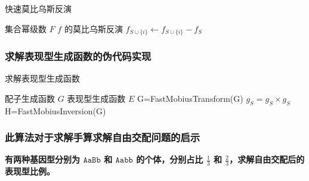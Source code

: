 \documentclass{article}
\begin{document}
\begin{algorithm}
    \caption{快速莫比乌斯反演}
    \begin{algorithmic}[1]
        \Require 集合幂级数 $F$
        \Ensure $f$ 的莫比乌斯反演
                    \State $f_{S \cup \{i\}} \gets f_{S \cup \{i\}} - f_{S}$
                \EndFor
            \EndFor
            \State {}
        \EndFunction
    \end{algorithmic}
\end{algorithm}

\newpage

\subsubsection*{求解表现型生成函数的伪代码实现}

\begin{algorithm}
    \caption{求解表现型生成函数}
    \begin{algorithmic}[1]
        \Require 配子生成函数 $G$
        \Ensure 表现型生成函数 $E$
			\State G=FastMobiusTransform(G)
                \State $g_S=g_S \times g_S$
            \EndFor
			\State H=FastMobiusInversion(G)
            \State {}
        \EndFunction
    \end{algorithmic}
\end{algorithm}

\subsubsection*{此算法对于求解手算求解自由交配问题的启示}

\textbf{有两种基因型分别为 $\texttt{AaBb}$ 和 $\texttt{Aabb}$ 的个体，分别占比 $\frac{1}{3}$ 和 $\frac{2}{3}$，求解自由交配后的表现型比例。}
\end{document}
